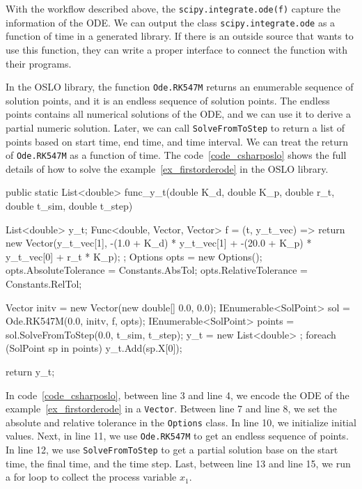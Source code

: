 With the workflow described above, the \verb|scipy.integrate.ode(f)| capture the information of the ODE. We can output the class \verb|scipy.integrate.ode| as a function of time in a generated library. If there is an outside source that wants to use this function, they can write a proper interface to connect the function with their programs. 

In the OSLO library, the function \verb|Ode.RK547M| returns an enumerable sequence of solution points, and it is an endless sequence of solution points. The endless points contains all numerical solutions of the ODE, and we can use it to derive a partial numeric solution. Later, we can call \verb|SolveFromToStep| to return a list of points based on start time, end time, and time interval. We can treat the return of \verb|Ode.RK547M| as a function of time. The code~\ref{code_csharposlo} shows the full details of how to solve the example~\ref{ex_firstorderode} in the OSLO library.

\begin{listing}[ht]
\begin{csharp1}
public static List<double> func_y_t(double K_d, double K_p, double r_t, double t_sim, double t_step) {
    List<double> y_t;
    Func<double, Vector, Vector> f = (t, y_t_vec) => {
        return new Vector(y_t_vec[1], -(1.0 + K_d) * y_t_vec[1] + -(20.0 + K_p) * y_t_vec[0] + r_t * K_p);
    };
    Options opts = new Options();
    opts.AbsoluteTolerance = Constants.AbsTol;
    opts.RelativeTolerance = Constants.RelTol;
    
    Vector initv = new Vector(new double[] {0.0, 0.0});
    IEnumerable<SolPoint> sol = Ode.RK547M(0.0, initv, f, opts);
    IEnumerable<SolPoint> points = sol.SolveFromToStep(0.0, t_sim, t_step);
    y_t = new List<double> {};
    foreach (SolPoint sp in points) {
        y_t.Add(sp.X[0]);
    }
    
    return y_t;
}
\end{csharp1}
\label{code_csharposlo}
\end{listing}

In code~\ref{code_csharposlo}, between line 3 and line 4, we encode the ODE of the example~\ref{ex_firstorderode} in a \verb|Vector|. Between line 7 and line 8, we set the absolute and relative tolerance in the \verb|Options| class. In line 10, we initialize initial values. Next, in line 11, we use \verb|Ode.RK547M| to get an endless sequence of points. In line 12, we use \verb|SolveFromToStep| to get a partial solution base on the start time, the final time, and the time step. Last, between line 13 and line 15, we run a for loop to collect the process variable $x_1$.

